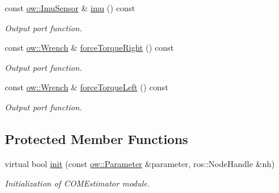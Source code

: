 \begin{DoxyCompactItemize}
const \hyperlink{classow__core_1_1InertialMeasurmentUnitSensor}{ow\+::\+Imu\+Sensor} \& \hyperlink{classow__hw__interface_1_1Robot_a2ae657f8d93fe861a382468492103373}{imu} () const 
\begin{DoxyCompactList}\small\item\em Output port function. \end{DoxyCompactList}\item 
const \hyperlink{classow__core_1_1Wrench}{ow\+::\+Wrench} \& \hyperlink{classow__hw__interface_1_1Robot_a0571a78d871be38bc9038daa244809c4}{force\+Torque\+Right} () const 
\begin{DoxyCompactList}\small\item\em Output port function. \end{DoxyCompactList}\item 
const \hyperlink{classow__core_1_1Wrench}{ow\+::\+Wrench} \& \hyperlink{classow__hw__interface_1_1Robot_a6ddf516951150570f293bd743980b889}{force\+Torque\+Left} () const 
\begin{DoxyCompactList}\small\item\em Output port function. \end{DoxyCompactList}\end{DoxyCompactItemize}
\subsection*{Protected Member Functions}
\begin{DoxyCompactItemize}
\item 
virtual bool \hyperlink{classow__hw__interface_1_1Robot_ab4e66ad524fcce85b3c2a2a8dc375cc6}{init} (const \hyperlink{classow_1_1Parameter}{ow\+::\+Parameter} \&parameter, ros\+::\+Node\+Handle \&nh)\hypertarget{classow__hw__interface_1_1Robot_ab4e66ad524fcce85b3c2a2a8dc375cc6}{}\label{classow__hw__interface_1_1Robot_ab4e66ad524fcce85b3c2a2a8dc375cc6}

\begin{DoxyCompactList}\small\item\em Initialization of C\+O\+M\+Estimator module. \end{DoxyCompactList}\end{DoxyCompactItemize}
